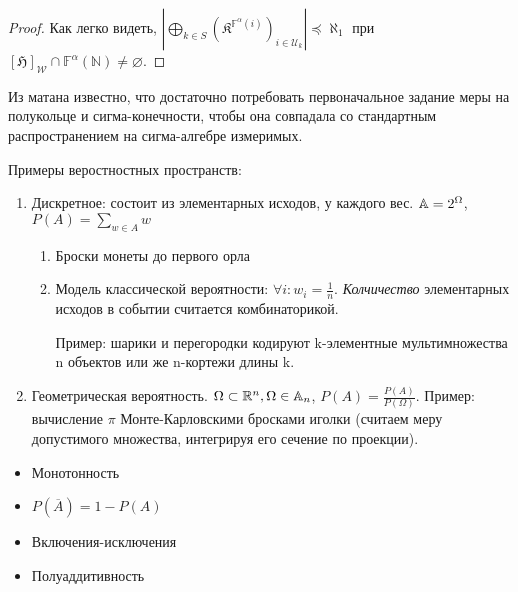 \documentclass[12pt, a4paper, oneside]{memoir}
\begin{document}
\begin{proof}
    Как легко видеть, $\left|\bigoplus_{k \in S}\left(\mathfrak{K}^{\mathbb{F}^\alpha(i)}\right)_{i \in \mathcal{U}_k}\right| \preccurlyeq \aleph_1$
    при $[\mathfrak{H}]_{\mathcal{W}} \cap \mathbb{F}^\alpha(\mathbb{N}) \neq \varnothing$.
\end{proof}

\begin{remark}
    Из матана известно, что достаточно потребовать первоначальное задание меры на полукольце
    и сигма-конечности, чтобы она совпадала со стандартным распространением на сигма-алгебре измеримых.
\end{remark}


\begin{example}
    Примеры веростностных пространств:

    \begin{enumerate}
        \item Дискретное: состоит из элементарных исходов, у каждого вес. ${\mathbb{A}} = 2^\Omega$, $P(A) = \sum_{w \in A} w$
        \begin{enumerate}
            \item Броски монеты до первого орла
            \item Модель классической вероятности: $\forall i: w_i = \frac{1}{n}$.
            \textit{Колчичество} элементарных исходов в событии считается комбинаторикой.

            Пример: шарики и перегородки кодируют k-элементные мультимножества n объектов или же n-кортежи длины k.
        \end{enumerate}

        \item Геометрическая вероятность. $\Omega \subset {\mathbb{R}}^n, \Omega \in {\mathbb{A}}_n$,
        $P(A) = \frac{P(A)}{P(\Omega)}$.
        Пример: вычисление $\pi$ Монте-Карловскими бросками иголки
        (считаем меру допустимого множества, интегрируя его сечение по проекции).
    \end{enumerate}
\end{example}


\begin{property}
    \begin{itemize}
        \item Монотонность
        \item $P(\overline{A}) = 1 - P(A)$
        \item Включения-исключения
        \item Полуаддитивность
    \end{itemize}
\end{property}
\end{document}
